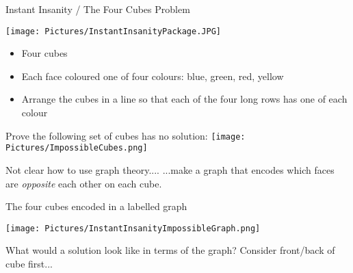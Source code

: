 \documentclass{beamer}
\begin{document}
\begin{frame}{Instant Insanity / The Four Cubes Problem}

\begin{center}
  \texttt{[image: Pictures/InstantInsanityPackage.JPG]}  
\end{center}
    \begin{itemize}
    \item Four cubes
    \item Each face coloured one of four colours: blue, green, red, yellow
    \item Arrange the cubes in a line so that each of the four long rows has one of each colour
\end{itemize}

\end{frame}
\begin{frame}{Prove the following set of cubes has no solution:}
\texttt{[image: Pictures/ImpossibleCubes.png]}
\begin{block}{Not clear how to use graph theory....}
   ...make a graph that encodes which faces are \emph{opposite} each other on each cube.
  \end{block}

\end{frame}  

\begin{frame}{The four cubes encoded in a labelled graph}
\begin{center}
  \texttt{[image: Pictures/InstantInsanityImpossibleGraph.png]}
\end{center}

\begin{block}{What would a solution look like in terms of the graph?}
 Consider front/back of cube first...
  
\end{block}

\end{frame}
\end{document}
